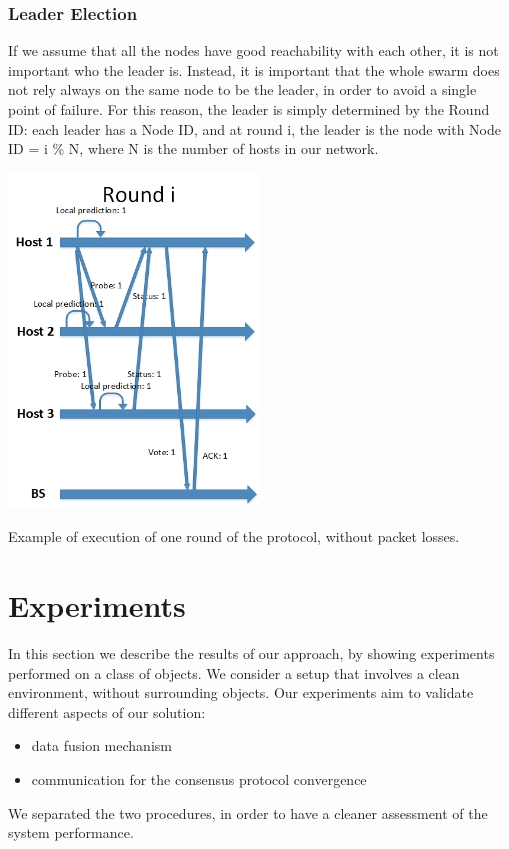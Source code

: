 \documentclass[10pt,conference,compsocconf]{IEEEtran}
\begin{document}
\begin{enumerate}
\subsubsection*{Leader Election}
If we assume that all the nodes have good reachability with each other, it is not important who the leader is. Instead, it is important that the whole swarm does not rely always on the same node to be the leader, in order to avoid a single point of failure. For this reason, the leader is simply determined by the Round ID: each leader has a Node ID, and at round i, the leader is the node with Node ID = i \% N, where N is the number of hosts in our network.
\begin{center}
	\captionsetup{type=figure}
	\includegraphics[width=0.5\textwidth]{img/temporal_sketch_NEW.jpg}
	\caption {Example of execution of one round of the protocol, without packet losses.}
	\label{fig:temporal_sketch}
\end{center}
\section{Experiments}
In this section we describe the results of our approach, by showing experiments performed on a class of objects.
We consider a setup that involves a clean environment, without surrounding objects.
Our experiments aim to validate different aspects of our solution:
\begin{itemize}
\item data fusion mechanism
\item communication for the consensus protocol convergence
\end{itemize}
We separated the two procedures, in order to have a cleaner assessment of the system performance.

\end{enumerate}
\end{document}
